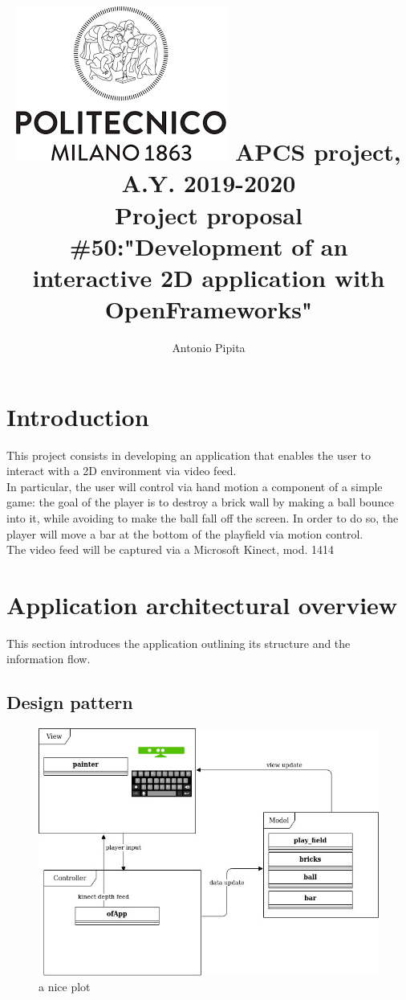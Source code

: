 \documentclass[]{article}
\title{\includegraphics[scale=0.5]{logo.png} APCS project, A.Y. 2019-2020\\Project proposal \#50:"Development of an interactive 2D application with  OpenFrameworks"}
\author{Antonio Pipita}
\begin{document}
\maketitle
\newpage
\tableofcontents
\newpage
\section{Introduction}
This project consists in developing an application that enables the user to interact with a 2D environment via video feed.\\
In particular, the user will control via hand motion a component of a simple game: the goal of the player is to destroy a brick wall by making a ball bounce into it, while avoiding to make the ball fall off the screen. In order to do so, the player will move a bar at the bottom of the playfield via motion control.\\
The video feed will be captured via a Microsoft Kinect, mod. 1414\\
\section{Application architectural overview}
This section introduces the application outlining its structure and the information flow.
\subsection{Design pattern}
\begin{figure}[h!]
    \centering
    \includegraphics[width=\textwidth]{MVC_mod.jpg}
    \caption{a nice plot}
    \label{fig:MVC}
\end{figure}
\end{document}
